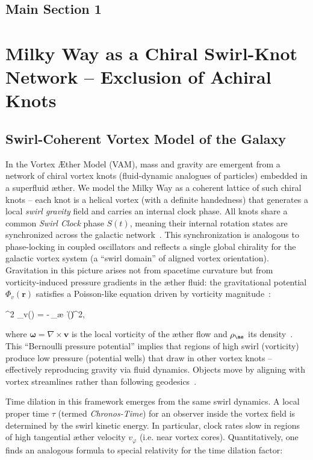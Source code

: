 \section*{Main Section 1}


\chapter*{Milky Way as a Chiral Swirl-Knot Network – Exclusion of Achiral Knots}

\section*{Swirl-Coherent Vortex Model of the Galaxy}

In the Vortex Æther Model (VAM), mass and gravity are emergent from a network of chiral vortex knots (fluid‐dynamic analogues of particles) embedded in a superfluid æther. We model the Milky Way as a coherent lattice of such chiral knots – each knot is a helical vortex (with a definite handedness) that generates a local \textit{swirl gravity} field and carries an internal clock phase. All knots share a common \textit{Swirl Clock} phase $S(t)$, meaning their internal rotation states are synchronized across the galactic network~\cite{iskandarani2025vam2}. This synchronization is analogous to phase-locking in coupled oscillators and reflects a single global chirality for the galactic vortex system (a “swirl domain” of aligned vortex orientation). Gravitation in this picture arises not from spacetime curvature but from vorticity-induced pressure gradients in the æther fluid: the gravitational potential $\Phi_v(\mathbf{r})$ satisfies a Poisson-like equation driven by vorticity magnitude~\cite{iskandarani2025vam2}:


 \nabla^2 \Phi_v() = -\,\rho_{\ae} \,\|\boldsymbol{\omega}()\|^2, \label{eq:swirl-grav}


where $\boldsymbol{\omega}=\nabla\times \mathbf{v}$ is the local vorticity of the æther flow and $\rho_{\ae}$ its density~\cite{iskandarani2025vam2}. This “Bernoulli pressure potential” implies that regions of high swirl (vorticity) produce low pressure (potential wells) that draw in other vortex knots – effectively reproducing gravity via fluid dynamics. Objects move by aligning with vortex streamlines rather than following geodesics~\cite{iskandarani2025vam2}.


Time dilation in this framework emerges from the same swirl dynamics. A local proper time $\tau$ (termed \textit{Chronos-Time}) for an observer inside the vortex field is determined by the swirl kinetic energy. In particular, clock rates slow in regions of high tangential æther velocity $v_{\varphi}$ (i.e. near vortex cores). Quantitatively, one finds an analogous formula to special relativity for the time dilation factor:


